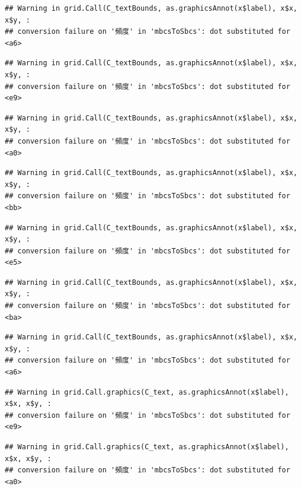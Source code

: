 \documentclass[
]{book}
\begin{document}
\begin{verbatim}
## Warning in grid.Call(C_textBounds, as.graphicsAnnot(x$label), x$x, x$y, :
## conversion failure on '頻度' in 'mbcsToSbcs': dot substituted for <a6>
\end{verbatim}

\begin{verbatim}
## Warning in grid.Call(C_textBounds, as.graphicsAnnot(x$label), x$x, x$y, :
## conversion failure on '頻度' in 'mbcsToSbcs': dot substituted for <e9>
\end{verbatim}

\begin{verbatim}
## Warning in grid.Call(C_textBounds, as.graphicsAnnot(x$label), x$x, x$y, :
## conversion failure on '頻度' in 'mbcsToSbcs': dot substituted for <a0>
\end{verbatim}

\begin{verbatim}
## Warning in grid.Call(C_textBounds, as.graphicsAnnot(x$label), x$x, x$y, :
## conversion failure on '頻度' in 'mbcsToSbcs': dot substituted for <bb>
\end{verbatim}

\begin{verbatim}
## Warning in grid.Call(C_textBounds, as.graphicsAnnot(x$label), x$x, x$y, :
## conversion failure on '頻度' in 'mbcsToSbcs': dot substituted for <e5>
\end{verbatim}

\begin{verbatim}
## Warning in grid.Call(C_textBounds, as.graphicsAnnot(x$label), x$x, x$y, :
## conversion failure on '頻度' in 'mbcsToSbcs': dot substituted for <ba>
\end{verbatim}

\begin{verbatim}
## Warning in grid.Call(C_textBounds, as.graphicsAnnot(x$label), x$x, x$y, :
## conversion failure on '頻度' in 'mbcsToSbcs': dot substituted for <a6>
\end{verbatim}

\begin{verbatim}
## Warning in grid.Call.graphics(C_text, as.graphicsAnnot(x$label), x$x, x$y, :
## conversion failure on '頻度' in 'mbcsToSbcs': dot substituted for <e9>
\end{verbatim}

\begin{verbatim}
## Warning in grid.Call.graphics(C_text, as.graphicsAnnot(x$label), x$x, x$y, :
## conversion failure on '頻度' in 'mbcsToSbcs': dot substituted for <a0>
\end{verbatim}
\end{document}

